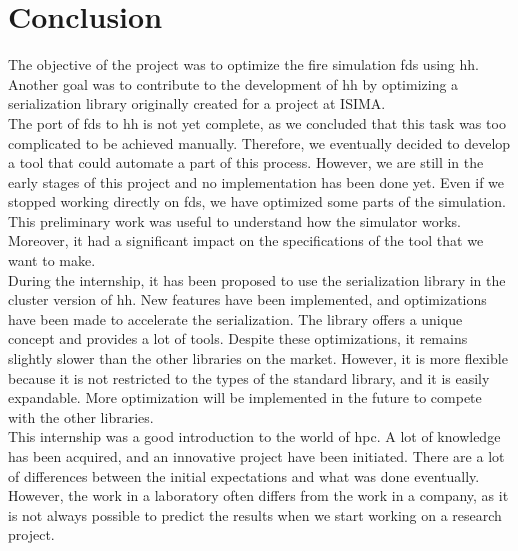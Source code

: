 
\newpage
\section*{Conclusion}

The objective of the project was to optimize the fire simulation \gls{fds} using
\gls{hh}. Another goal was to contribute to the development of \gls{hh} by
optimizing a serialization library originally created for a project at ISIMA.\\

The port of \gls{fds} to \gls{hh} is not yet complete, as we concluded that this
task was too complicated to be achieved manually. Therefore, we eventually
decided to develop a tool that could automate a part of this process. However,
we are still in the early stages of this project and no implementation has been
done yet. Even if we stopped working directly on \gls{fds}, we have optimized
some parts of the simulation. This preliminary work was useful to understand how
the simulator works. Moreover, it had a significant impact on the specifications
of the tool that we want to make.\\

During the internship, it has been proposed to use the serialization library in
the cluster version of \gls{hh}. New features have been implemented, and
optimizations have been made to accelerate the serialization. The library offers
a unique concept and provides a lot of tools. Despite these optimizations, it
remains slightly slower than the other libraries on the market. However, it is
more flexible because it is not restricted to the types of the standard library,
and it is easily expandable. More optimization will be implemented in the future
to compete with the other libraries.\\

This internship was a good introduction to the world of \gls{hpc}. A lot of
knowledge has been acquired, and an innovative project have been initiated.
There are a lot of differences between the initial expectations and what was
done eventually. However, the work in a laboratory often differs from the work
in a company, as it is not always possible to predict the results when we start
working on a research project.

\label{lastPage}
\newpage
\pagestyle{empty}
